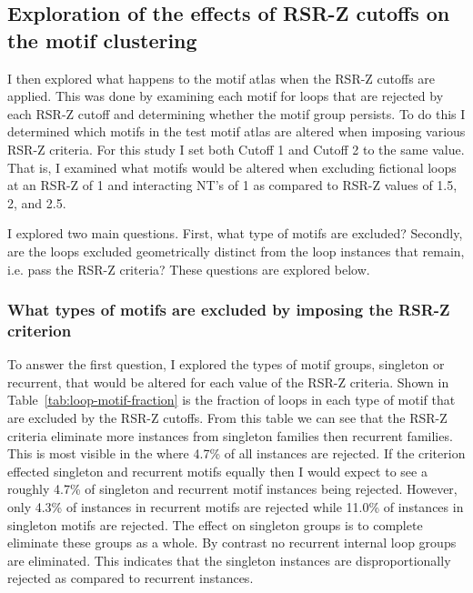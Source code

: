 \subsection{Exploration of the effects of RSR-Z cutoffs on the motif clustering}

I then explored what happens to the motif atlas when the RSR-Z cutoffs are
applied. This was done by examining each motif for loops that are rejected by
each RSR-Z cutoff and determining whether the motif group persists. To do this I
determined which motifs in the test motif atlas are altered when imposing
various RSR-Z criteria. For this study I set both Cutoff 1 and Cutoff 2 to the
same value. That is, I examined what motifs would be altered when excluding
fictional loops at an RSR-Z of 1 and interacting NT's of
1 as compared to RSR-Z values of 1.5, 2, and 2.5.

I explored two main questions. First, what type of motifs are excluded?
Secondly, are the loops excluded geometrically distinct from the loop instances
that remain, i.e. pass the RSR-Z criteria? These questions are explored below.

\subsubsection{What types of motifs are excluded by imposing the RSR-Z criterion}

To answer the first question, I explored the types of motif groups, singleton or
recurrent, that would be altered for each value of the RSR-Z criteria. Shown in
Table~\ref{tab:loop-motif-fraction} is the fraction of loops in each type of
motif that are excluded by the RSR-Z cutoffs. From this table we can see that
the RSR-Z criteria eliminate more instances from singleton families then
recurrent families. This is most visible in the  where 4.7\% of all
instances are rejected. If the criterion effected singleton and recurrent motifs
equally then I would expect to see a roughly 4.7\% of singleton and recurrent
motif instances being rejected. However, only 4.3\% of instances in recurrent
motifs are rejected while 11.0\% of instances in singleton motifs are rejected.
The effect on singleton groups is to complete eliminate these groups as a whole.
By contrast no recurrent internal loop groups are eliminated. This indicates
that the singleton instances are disproportionally rejected as compared to
recurrent instances.

